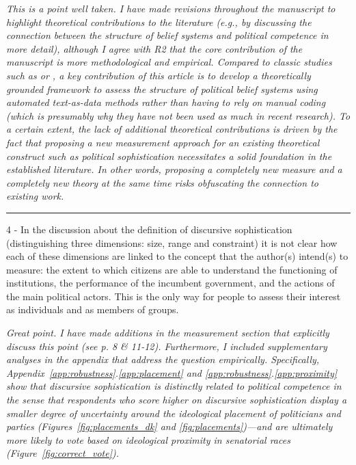 \textit{This is a point well taken. I have made revisions throughout the manuscript to highlight theoretical contributions to the literature (e.g., by discussing the connection between the structure of belief systems and political competence in more detail), although I agree with R2 that the core contribution of the manuscript is more methodological and empirical. Compared to classic studies such as \citet{converse1964nature} or \citet{luskin1987measuring}, a key contribution of this article is to develop a theoretically grounded framework to assess the structure of political belief systems using automated text-as-data methods rather than having to rely on manual coding (which is presumably why they have not been used as much in recent research). To a certain extent, the lack of additional theoretical contributions is driven by the fact that proposing a new measurement approach for an existing theoretical construct such as political sophistication necessitates a solid foundation in the established literature. In other words, proposing a completely new measure {\normalfont and} a completely new theory at the same time risks obfuscating the connection to existing work.}


\rule{\linewidth}{.01cm}

4 - In the discussion about the definition of discursive sophistication (distinguishing three dimensions: size, range and constraint) it is not clear how each of these dimensions are linked to the concept that the author(s) intend(s) to measure: the extent to which citizens are able to understand the functioning of institutions, the performance of the incumbent government, and the actions of the main political actors. This is the only way for people to assess their interest as individuals and as members of groups.

\textit{Great point. I have made additions in the measurement section that explicitly discuss this point (see p. 8 \& 11-12). Furthermore, I included supplementary analyses in the appendix that address the question empirically. Specifically, Appendix~\ref{app:robustness}.\ref{app:placement} and \ref{app:robustness}.\ref{app:proximity} show that discursive sophistication is distinctly related to political competence in the sense that respondents who score higher on discursive sophistication display a smaller degree of uncertainty around the ideological placement of politicians and parties (Figures~\ref{fig:placements_dk} and \ref{fig:placements})---and are ultimately more likely to vote based on ideological proximity in senatorial races (Figure~\ref{fig:correct_vote}).}

